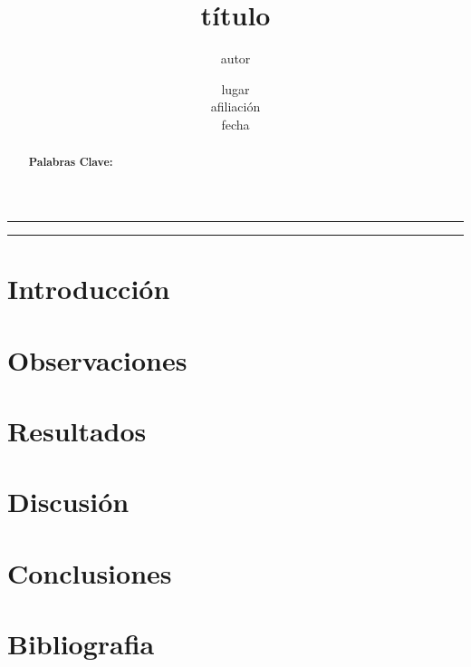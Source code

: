 \documentclass[12pt,a4paper]{article} %
\author{autor} %
\title{título} %
\date{lugar\\afiliación\\fecha} %
\begin{document}
\maketitle %
\begin{center}\rule{0.9\textwidth}{0.1mm} \end{center}
\begin{abstract}

{\bf Palabras Clave:} %
\end{abstract}
\begin{center}\rule{0.9\textwidth}{0.1mm} \end{center}

\begin{multicols}{2}

\section{Introducción}

\section{Observaciones}

\section{Resultados}

\section{Discusión}

\section{Conclusiones}

\section{Bibliografia}

\end{multicols}

\newpage
\appendix
\end{document}
